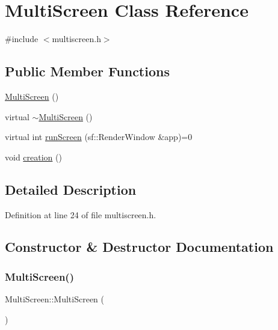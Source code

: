 \hypertarget{class_multi_screen}{}\section{Multi\+Screen Class Reference}
\label{class_multi_screen}


{\ttfamily \#include $<$multiscreen.\+h$>$}

\subsection*{Public Member Functions}
\begin{DoxyCompactItemize}
\item 
\hyperlink{class_multi_screen_aa3f02b0e149b776bbdfc72b2837021bd}{Multi\+Screen} ()
\item 
virtual \hyperlink{class_multi_screen_a1b57e27d1b490cd40fd67cf4aca01f2c}{$\sim$\+Multi\+Screen} ()
\item 
virtual int \hyperlink{class_multi_screen_a76ec369d025ed4dafdf81fdf5100937b}{run\+Screen} (sf\+::\+Render\+Window \&app)=0
\item 
void \hyperlink{class_multi_screen_a543c3d0f0c8f9346bf5c9e3fb1eb8c99}{creation} ()
\end{DoxyCompactItemize}


\subsection{Detailed Description}


Definition at line 24 of file multiscreen.\+h.



\subsection{Constructor \& Destructor Documentation}
\mbox{\label{class_multi_screen_aa3f02b0e149b776bbdfc72b2837021bd}} 
\subsubsection{\texorpdfstring{Multi\+Screen()}{MultiScreen()}}
{\footnotesize\ttfamily Multi\+Screen\+::\+Multi\+Screen (\begin{DoxyParamCaption}{ }\end{DoxyParamCaption})\hspace{0.3cm}{\ttfamily [inline]}}

